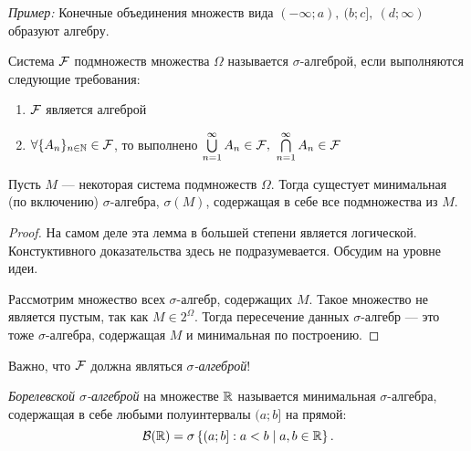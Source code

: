 \begin{itemize}
\begin{definition}
            \textit{Пример:} Конечные объединения множеств вида \( (-\infty; a),\ (b; c],\ (d; \infty) \) образуют алгебру.

        \end{definition}

        \begin{definition}
            Система $ \mathcal{F} $ подмножеств множества $ \Omega $ называется $ \sigma $-алгеброй, если выполняются следующие требования:

            \begin{enumerate}
                \item $ \mathcal{F} $ является алгеброй

                \item  \(\forall \{A_n\}_{n\in\mathbb{N}} \in \mathcal{F}\), то выполнено \(\bigcup\limits_{n = 1}^{\infty}A_n \in \mathcal{F}, \ \bigcap\limits_{n = 1}^{\infty}A_n \in \mathcal{F} \)
            \end{enumerate}

        \end{definition}

        \begin{lemma}
            Пусть $ M $ --- некоторая система подмножеств $ \Omega $. Тогда сущестует минимальная (по включению) $ \sigma $-алгебра, $ \sigma(M) $, содержащая в себе все подмножества из $ M $.
        \end{lemma}

        \begin{proof}
            На самом деле эта лемма в большей степени является логической. Констуктивного доказательства здесь не подразумевается. Обсудим на уровне идеи.

            Рассмотрим множество всех $\sigma$-алгебр, содержащих $ M $. Такое множество не является пустым, так как \(M \in 2^{\Omega}\). Тогда пересечение данных $ \sigma $-алгебр --- это тоже $ \sigma $-алгебра, содержащая $ M $ и минимальная по построению.
        \end{proof}

    Важно, что $ \mathcal{F} $ должна являться \emph{$ \sigma $-алгеброй}!

        \begin{definition}
            \emph{Борелевской $ \sigma $-алгеброй} на множестве $ \mathbb{R} $ называется минимальная $ \sigma $-алгебра, содержащая в себе любыми полуинтервалы \((a; b] \) на прямой:
            \[
                \mathcal{B}(\mathbb{R}) = \sigma\left\{(a; b] : a < b \mid a, b \in \mathbb{R} \right\}.
            \]
        \end{definition}


\end{itemize}
